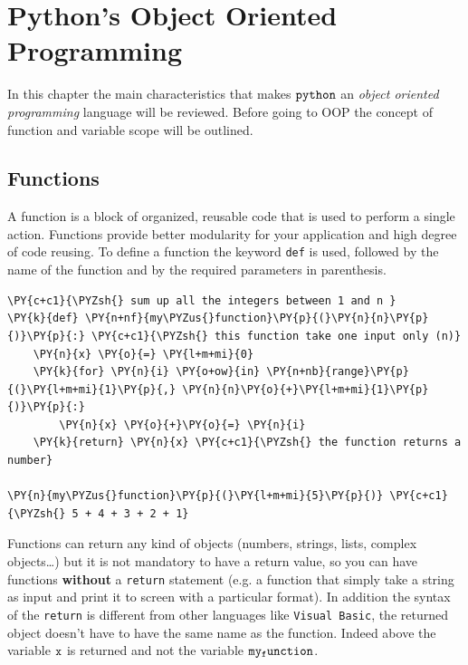 \chapter{Python's Object Oriented Programming}\label{introduction-to-python---lesson-2}

In this chapter the main characteristics that makes $\tt{python}$ an \textit{object oriented programming} language will be reviewed.
Before going to OOP the concept of function and variable scope will be outlined.

\section{Functions}\label{functions}

A function is a block of organized, reusable code that is used to perform a single action. Functions provide better modularity for your application and high degree of code reusing.
To define a function the keyword \texttt{def} is used, followed by the name of the function and by the required parameters in parenthesis.

\begin{Verbatim}[commandchars=\\\{\}]
\PY{c+c1}{\PYZsh{} sum up all the integers between 1 and n }
\PY{k}{def} \PY{n+nf}{my\PYZus{}function}\PY{p}{(}\PY{n}{n}\PY{p}{)}\PY{p}{:} \PY{c+c1}{\PYZsh{} this function take one input only (n)}
    \PY{n}{x} \PY{o}{=} \PY{l+m+mi}{0}
    \PY{k}{for} \PY{n}{i} \PY{o+ow}{in} \PY{n+nb}{range}\PY{p}{(}\PY{l+m+mi}{1}\PY{p}{,} \PY{n}{n}\PY{o}{+}\PY{l+m+mi}{1}\PY{p}{)}\PY{p}{:}
        \PY{n}{x} \PY{o}{+}\PY{o}{=} \PY{n}{i}
    \PY{k}{return} \PY{n}{x} \PY{c+c1}{\PYZsh{} the function returns a number}

\PY{n}{my\PYZus{}function}\PY{p}{(}\PY{l+m+mi}{5}\PY{p}{)} \PY{c+c1}{\PYZsh{} 5 + 4 + 3 + 2 + 1}
\end{Verbatim}

Functions can return any kind of objects (numbers, strings, lists, complex objects\ldots{}) but it is not mandatory to have a return value, so you can have functions \textbf{without} a \texttt{return} statement (e.g. a function that simply take a string as input and print it to screen with a particular format).
In addition the syntax of the \texttt{return} is different from other languages like \texttt{Visual\ Basic}, the returned object doesn't have to have the same name as the function. Indeed above the variable $\tt{x}$ is returned and not the variable $\tt{my_function}$.


